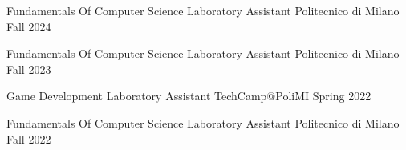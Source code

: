 


\begin{cvhonors}
  \cvhonor
    {Fundamentals Of Computer Science} {Laboratory Assistant}  {Politecnico di Milano} {Fall 2024} 
    

  \cvhonor
    {Fundamentals Of Computer Science} %
    {Laboratory Assistant} %
    {Politecnico di Milano} %
    {Fall 2023} %
    
  \cvhonor
    {Game Development} %
    {Laboratory Assistant} %
    {TechCamp@PoliMI} %
    {Spring 2022} %
    
  \cvhonor
    {Fundamentals Of Computer Science} %
    {Laboratory Assistant} %
    {Politecnico di Milano} %
    {Fall 2022} %
    
\end{cvhonors}

